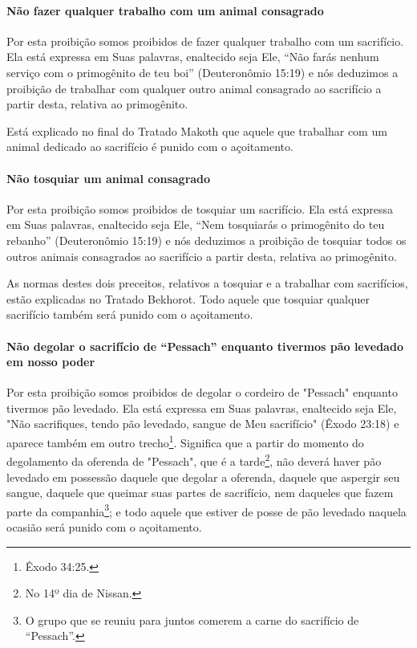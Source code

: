 \paragraph{Não fazer qualquer trabalho com um animal consagrado}

Por esta proibição somos proibidos de fazer qualquer trabalho com um
sacrifício. Ela está expressa em Suas palavras, enaltecido seja Ele,
``Não farás nenhum serviço com o primogênito de teu boi'' (Deuteronômio
15:19) e nós deduzimos a proibição de trabalhar com qualquer outro
animal consagrado ao sacrifício a partir desta, relativa ao
primogênito.

Está explicado no final do Tratado Makoth que aquele que trabalhar com
um animal dedicado ao sacrifício é punido com o açoitamento.

\paragraph{Não tosquiar um animal consagrado}

Por esta proibição somos proibidos de tosquiar um sacrifício. Ela está
expressa em Suas palavras, enaltecido seja Ele, ``Nem tosquiarás o
primogênito do teu rebanho'' (Deuteronômio 15:19) e nós deduzimos a
proibição de tosquiar todos os outros animais consagrados ao sacrifício
a partir desta, relativa ao primogênito.

As normas destes dois preceitos, relativos a tosquiar e a trabalhar com
sacrifícios, estão explicadas no Tratado Bekhorot. Todo aquele que
tosquiar qualquer sacrifício também será punido com o açoitamento.

\paragraph{Não degolar o sacrifício de ``Pessach'' enquanto tivermos pão
levedado em nosso poder}

Por esta proibição somos proibidos de degolar o cordeiro de "Pessach"
enquanto tivermos pão levedado. Ela está expressa em Suas palavras,
enaltecido seja Ele, "Não sacrifiques, tendo pão levedado, sangue de
Meu sacrifício" (Êxodo 23:18) e aparece também em outro
trecho\footnote{Êxodo 34:25.}. Significa que a partir do momento do
degolamento da oferenda de "Pessach", que é a
tarde\footnote{No 14º dia de Nissan.}, não deverá haver pão levedado em possessão
daquele que degolar a oferenda, daquele que aspergir seu sangue, daquele
que queimar suas partes de sacrifício, nem daqueles que fazem parte da
companhia\footnote{O grupo que se reuniu para juntos comerem a carne do sacrifício de
  ``Pessach''.}; e todo aquele que estiver de posse de
pão levedado naquela ocasião será punido com o açoitamento.

